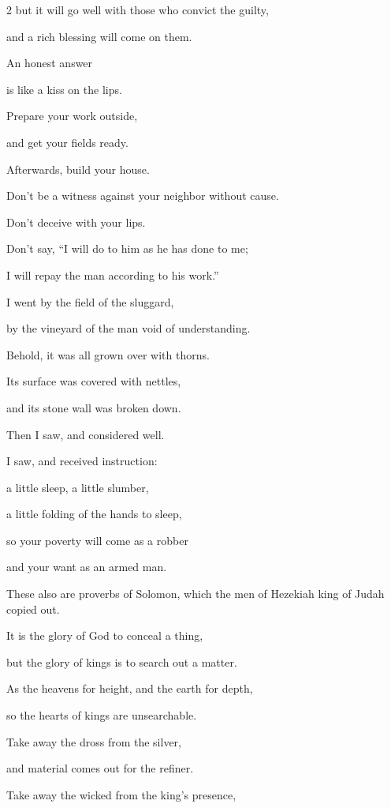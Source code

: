 \begin{multicols}{2}
\myverse{}but it will go well with those who convict the guilty,

and a rich blessing will come on them.


\myverse{}An honest answer

is like a kiss on the lips.


\myverse{}Prepare your work outside,

and get your fields ready.

Afterwards, build your house.


\myverse{}Don’t be a witness against your neighbor without cause.

Don’t deceive with your lips.


\myverse{}Don’t say, “I will do to him as he has done to me;

I will repay the man according to his work.”


\myverse{}I went by the field of the sluggard,

by the vineyard of the man void of understanding.


\myverse{}Behold, it was all grown over with thorns.

Its surface was covered with nettles,

and its stone wall was broken down.


\myverse{}Then I saw, and considered well.

I saw, and received instruction:


\myverse{}a little sleep, a little slumber,

a little folding of the hands to sleep,


\myverse{}so your poverty will come as a robber

and your want as an armed man.


\mychapter{} \myverse*{}These also are proverbs of Solomon, which the men of Hezekiah
king of Judah copied out.


\myverse{}It is the glory of God to conceal a thing,

but the glory of kings is to search out a matter.


\myverse{}As the heavens for height, and the earth for depth,

so the hearts of kings are unsearchable.


\myverse{}Take away the dross from the silver,

and material comes out for the refiner.


\myverse{}Take away the wicked from the king’s presence,


\end{multicols}

